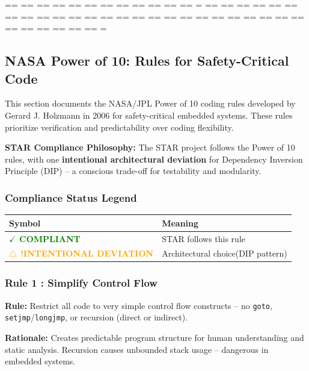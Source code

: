     == == == == == == == == == == == ==
    = %
      == == == == == == == == == == == == == == == == == == == == == == == == ==
      == == == == == ==
    =

\subsection{NASA Power of 10: Rules for Safety-Critical Code
}
\label{sec:nasa-power-of-10}

This section documents the NASA/JPL Power of 10 coding rules developed by Gerard J. Holzmann in 2006 for safety-critical embedded systems. These rules prioritize verification and predictability over coding flexibility.

\textbf{STAR Compliance Philosophy:} The STAR project follows the Power of 10 rules, with one \textbf{intentional architectural deviation
} for Dependency Inversion Principle (DIP) -- a conscious trade-off for testability and modularity.

\subsubsection{Compliance Status Legend
 }

\begin{table}[H]
\centering
\begin{tabular} { | l | l |}
\hline
\textbf{Symbol} & \textbf{Meaning}
\\
\hline
\textcolor{green} {\textbf{$\checkmark$ COMPLIANT}} & STAR follows this rule \\
\hline
\textcolor{orange} {\textbf{$\triangle$ !INTENTIONAL DEVIATION}} &
    Architectural choice(DIP pattern) \\
\hline
\end{tabular}
\end{table}

\subsubsection{Rule 1 : Simplify Control Flow}

\textbf{Rule:} Restrict all code to very simple control flow constructs -- no \texttt{goto}, \texttt{setjmp}/\texttt{longjmp}, or recursion (direct or indirect).

\textbf{Rationale:} Creates predictable program structure for human understanding and static analysis. Recursion causes unbounded stack usage -- dangerous in embedded systems.

